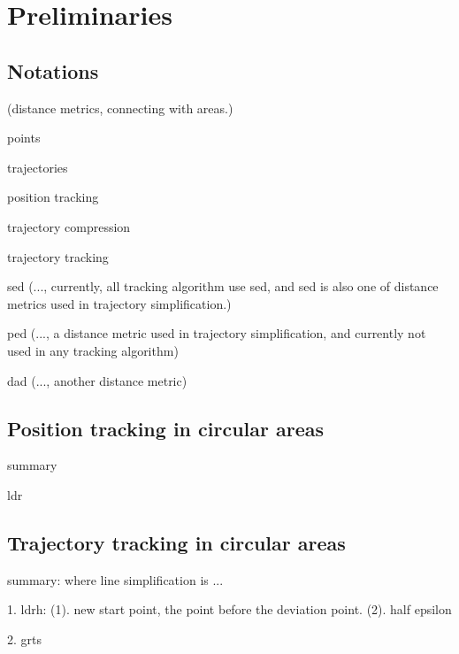 



\section{Preliminaries}
\label{sec-pre}

\subsection{Notations}
(distance metrics, connecting with areas.)

points

trajectories

position tracking

trajectory compression

trajectory tracking


sed (..., currently, all tracking algorithm use sed, and sed is also one of distance metrics used in trajectory simplification.)

ped (..., a distance metric used in trajectory simplification, and currently not used in any tracking algorithm)

dad (..., another distance metric)


\subsection{Position tracking in circular areas}
summary

ldr

\subsection{Trajectory tracking in circular areas}
summary: 
where line simplification is ...

1. ldrh: (1). new start point, the point before the deviation point. (2). half epsilon

2. grts




